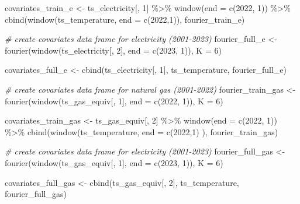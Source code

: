 \documentclass[
]{article}
\newenvironment{Shaded}{\begin{snugshade}}{\end{snugshade}}
\newcommand{\AttributeTok}[1]{\textcolor[rgb]{0.77,0.63,0.00}{#1}}
\newcommand{\CommentTok}[1]{\textcolor[rgb]{0.56,0.35,0.01}{\textit{#1}}}
\newcommand{\DecValTok}[1]{\textcolor[rgb]{0.00,0.00,0.81}{#1}}
\newcommand{\FunctionTok}[1]{\textcolor[rgb]{0.00,0.00,0.00}{#1}}
\newcommand{\NormalTok}[1]{#1}
\newcommand{\OtherTok}[1]{\textcolor[rgb]{0.56,0.35,0.01}{#1}}
\newcommand{\SpecialCharTok}[1]{\textcolor[rgb]{0.00,0.00,0.00}{#1}}
\begin{document}
\begin{Shaded}
\begin{Highlighting}[]
\NormalTok{covariates\_train\_e }\OtherTok{\textless{}{-}}\NormalTok{ ts\_electricity[, }\DecValTok{1}\NormalTok{] }\SpecialCharTok{\%\textgreater{}\%} 
  \FunctionTok{window}\NormalTok{(}\AttributeTok{end =} \FunctionTok{c}\NormalTok{(}\DecValTok{2022}\NormalTok{, }\DecValTok{1}\NormalTok{)) }\SpecialCharTok{\%\textgreater{}\%} 
  \FunctionTok{cbind}\NormalTok{(}\FunctionTok{window}\NormalTok{(ts\_temperature, }\AttributeTok{end =} \FunctionTok{c}\NormalTok{(}\DecValTok{2022}\NormalTok{,}\DecValTok{1}\NormalTok{)),}
\NormalTok{        fourier\_train\_e)}


\CommentTok{\# create covariates data frame for electricity (2001{-}2023)}
\NormalTok{fourier\_full\_e }\OtherTok{\textless{}{-}} \FunctionTok{fourier}\NormalTok{(}\FunctionTok{window}\NormalTok{(ts\_electricity[, }\DecValTok{2}\NormalTok{],}
                                \AttributeTok{end =} \FunctionTok{c}\NormalTok{(}\DecValTok{2023}\NormalTok{, }\DecValTok{1}\NormalTok{)),}
                         \AttributeTok{K =} \DecValTok{6}\NormalTok{)}

\NormalTok{covariates\_full\_e }\OtherTok{\textless{}{-}} \FunctionTok{cbind}\NormalTok{(ts\_electricity[, }\DecValTok{1}\NormalTok{], ts\_temperature, fourier\_full\_e)}

\CommentTok{\# create covariates data frame for natural gas (2001{-}2022)}
\NormalTok{fourier\_train\_gas }\OtherTok{\textless{}{-}} \FunctionTok{fourier}\NormalTok{(}\FunctionTok{window}\NormalTok{(ts\_gas\_equiv[, }\DecValTok{1}\NormalTok{],}
                                \AttributeTok{end =} \FunctionTok{c}\NormalTok{(}\DecValTok{2022}\NormalTok{, }\DecValTok{1}\NormalTok{)),}
                         \AttributeTok{K =} \DecValTok{6}\NormalTok{)}

\NormalTok{covariates\_train\_gas }\OtherTok{\textless{}{-}}\NormalTok{ ts\_gas\_equiv[, }\DecValTok{2}\NormalTok{] }\SpecialCharTok{\%\textgreater{}\%} 
  \FunctionTok{window}\NormalTok{(}\AttributeTok{end =} \FunctionTok{c}\NormalTok{(}\DecValTok{2022}\NormalTok{, }\DecValTok{1}\NormalTok{)) }\SpecialCharTok{\%\textgreater{}\%} 
  \FunctionTok{cbind}\NormalTok{(}\FunctionTok{window}\NormalTok{(ts\_temperature, }\AttributeTok{end =} \FunctionTok{c}\NormalTok{(}\DecValTok{2022}\NormalTok{,}\DecValTok{1}\NormalTok{)}
\NormalTok{               ),}
\NormalTok{        fourier\_train\_gas)}


\CommentTok{\# create covariates data frame for electricity (2001{-}2023)}
\NormalTok{fourier\_full\_gas }\OtherTok{\textless{}{-}} \FunctionTok{fourier}\NormalTok{(}\FunctionTok{window}\NormalTok{(ts\_gas\_equiv[, }\DecValTok{1}\NormalTok{],}
                                \AttributeTok{end =} \FunctionTok{c}\NormalTok{(}\DecValTok{2023}\NormalTok{, }\DecValTok{1}\NormalTok{)),}
                         \AttributeTok{K =} \DecValTok{6}\NormalTok{)}

\NormalTok{covariates\_full\_gas }\OtherTok{\textless{}{-}} \FunctionTok{cbind}\NormalTok{(ts\_gas\_equiv[, }\DecValTok{2}\NormalTok{], ts\_temperature, fourier\_full\_gas)}
\end{Highlighting}
\end{Shaded}
\end{document}
